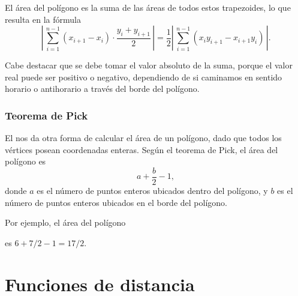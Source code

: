 El área del polígono es la suma de las áreas de todos estos trapezoides, lo
que resulta en la fórmula
\[\left|\,\sum_{i=1}^{n-1} (x_{i+1}-x_{i}) \cdot \frac{y_i+y_{i+1}}{2}\,\right| =
    \frac{1}{2} \left|\,\sum_{i=1}^{n-1} (x_i y_{i+1} - x_{i+1} y_i)\,\right|.\]

Cabe destacar que se debe tomar el valor absoluto de la suma, porque el valor
real puede ser positivo o negativo, dependiendo de si caminamos en sentido
horario o antihorario a través del borde del polígono.

\subsubsection{Teorema de Pick}


El  nos da otra forma de calcular el área de un polígono,
dado que todos los vértices posean coordenadas enteras. Según el teorema de
Pick, el área del polígono es \[ a + \frac{b}{2} - 1,\] donde $a$ es el
número de puntos enteros ubicados dentro del polígono, y $b$ es el número de
puntos enteros ubicados en el borde del polígono.

Por ejemplo, el área del polígono
\begin{center}
\end{center}
es $6+7/2-1=17/2$.

\section{Funciones de distancia}

